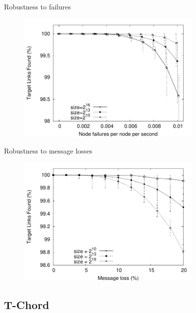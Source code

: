 \begin{frame}{Robustness to failures}
	
\begin{figure}
	\includegraphics[width=0.80\textwidth]{figs/11/sort-crash}
\end{figure}	
	
\end{frame}

\begin{frame}{Robustness to message losses}
	
\begin{figure}
	\includegraphics[width=0.80\textwidth]{figs/11/sort-loss-qual}
\end{figure}	
	
\end{frame}

\subsection{T-Chord}

